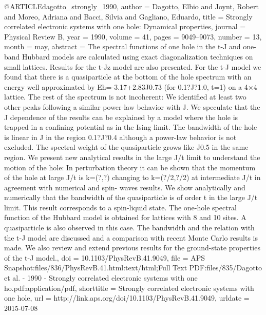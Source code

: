 @ARTICLE{dagotto_strongly_1990,
  author = {Dagotto, Elbio and Joynt, Robert and Moreo, Adriana and Bacci, Silvia
	and Gagliano, Eduardo},
  title = {Strongly correlated electronic systems with one hole: {Dynamical}
	properties},
  journal = {Physical Review B},
  year = {1990},
  volume = {41},
  pages = {9049--9073},
  number = {13},
  month = may,
  abstract = {The spectral functions of one hole in the t-J and one-band Hubbard
	models are calculated using exact diagonalization techniques on small
	lattices. Results for the t-Jz model are also presented. For the
	t-J model we found that there is a quasiparticle at the bottom of
	the hole spectrum with an energy well approximated by Eh=-3.17+2.83J0.73
	(for 0.1?J?1.0, t=1) on a 4×4 lattice. The rest of the spectrum is
	not incoherent: We identified at least two other peaks following
	a similar power-law behavior with J. We speculate that the J dependence
	of the results can be explained by a model where the hole is trapped
	in a confining potential as in the Ising limit. The bandwidth of
	the hole is linear in J in the region 0.1?J?0.4 although a power-law
	behavior is not excluded. The spectral weight of the quasiparticle
	grows like J0.5 in the same region. We present new analytical results
	in the large J/t limit to understand the motion of the hole: In perturbation
	theory it can be shown that the momentum of the hole at large J/t
	is k=(?,?) changing to k=(?/2,?/2) at intermediate J/t in agreement
	with numerical and spin- waves results. We show analytically and
	numerically that the bandwidth of the quasiparticle is of order t
	in the large J/t limit. This result corresponds to a spin-liquid
	state. The one-hole spectral function of the Hubbard model is obtained
	for lattices with 8 and 10 sites. A quasiparticle is also observed
	in this case. The bandwidth and the relation with the t-J model are
	discussed and a comparison with recent Monte Carlo results is made.
	We also review and extend previous results for the ground-state properties
	of the t-J model.},
  doi = {10.1103/PhysRevB.41.9049},
  file = {APS Snapshot:files/836/PhysRevB.41.html:text/html;Full Text PDF:files/835/Dagotto et al. -     1990 - Strongly correlated electronic systems with one ho.pdf:application/pdf},
  shorttitle = {Strongly correlated electronic systems with one hole},
  url = {http://link.aps.org/doi/10.1103/PhysRevB.41.9049},
  urldate = {2015-07-08}
}

